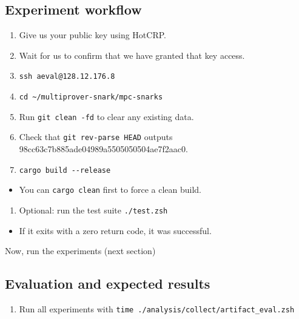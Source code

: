 \documentclass[letterpaper,twocolumn,10pt]{article}
\providecommand{\tightlist}{%
  \setlength{\itemsep}{0pt}\setlength{\parskip}{0pt}}
\begin{document}
{%
\subsection{Experiment workflow}

\begin{enumerate}
\def\labelenumi{\arabic{enumi}.}
\tightlist
\item
  Give us your public key using HotCRP.
\item
  Wait for us to confirm that we have granted that key access.
\item
  \texttt{ssh\ aeval@128.12.176.8}
\item
  \texttt{cd\ \textasciitilde{}/multiprover-snark/mpc-snarks}
\item
  Run \texttt{git\ clean\ -fd} to clear any existing data.
\item
  Check that \texttt{git\ rev-parse\ HEAD} outputs
  98cc63c7b885ade04989a5505050504ae7f2aac0.
\item
  \texttt{cargo\ build\ -\/-release}
\end{enumerate}

\begin{itemize}
\tightlist
\item
  You can \texttt{cargo\ clean} first to force a clean build.
\end{itemize}

\begin{enumerate}
\def\labelenumi{\arabic{enumi}.}
\setcounter{enumi}{4}
\tightlist
\item
  Optional: run the test suite \texttt{./test.zsh}
\end{enumerate}

\begin{itemize}
\tightlist
\item
  If it exits with a zero return code, it was successful.
\end{itemize}
Now, run the experiments (next section)
\subsection{Evaluation and expected results}

\begin{enumerate}
\def\labelenumi{\arabic{enumi}.}
\tightlist
\item
  Run all experiments with
  \texttt{time\ ./analysis/collect/artifact\_eval.zsh}
\end{enumerate}

}
\end{document}
